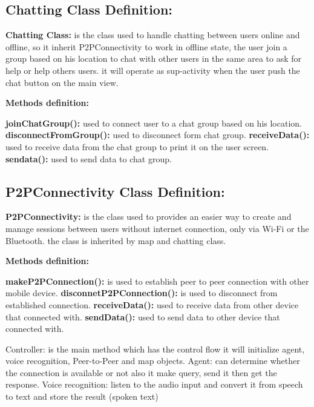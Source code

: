 \documentclass{scrreprt}
\begin{document}
\subsection{Chatting Class Definition:}

\textbf{Chatting Class:} is the class used to handle chatting between users online and offline, so it inherit P2PConnectivity to work in offline state, the user join a group based on his location to chat with other users in the same area to ask for help or help others users. it will operate as sup-activity when the user push the chat button on the main view.

\textbf{Methods definition:}

\textbf{joinChatGroup():} used to connect user to a chat group based on his location.
\textbf{disconnectFromGroup():} used to disconnect form chat group.
\textbf{receiveData(): } used to receive data from the chat group to print it on the user screen.
\textbf{sendata(): } used to send data to chat group.

\subsection{P2PConnectivity Class Definition:}

\textbf{P2PConnectivity:} is the class used to  provides an easier way to create and manage sessions between users without internet connection, only via Wi-Fi or the Bluetooth. the class is inherited by map and chatting class.

\textbf{Methods definition:}

\textbf{makeP2PConnection():} is used to establish peer to peer connection with other mobile device.
\textbf{disconnetP2PConnection():} is used to disconnect from established connection.
\textbf{receiveData(): } used to receive data from other device that connected with.
\textbf{sendData(): } used to send data to other device that  connected with.

\clearpage


\begin{figure}[ht!]
    \centering
    
    \label{fig:my_label}
\end{figure}

Controller: is the main method which has the control flow it will initialize agent, voice recognition, Peer-to-Peer and map objects.
Agent: can determine whether the connection is available or not also it make query, send it then get the response.
Voice recognition: listen to the audio input and convert it from speech to text and store the result (spoken text)
\end{document}
